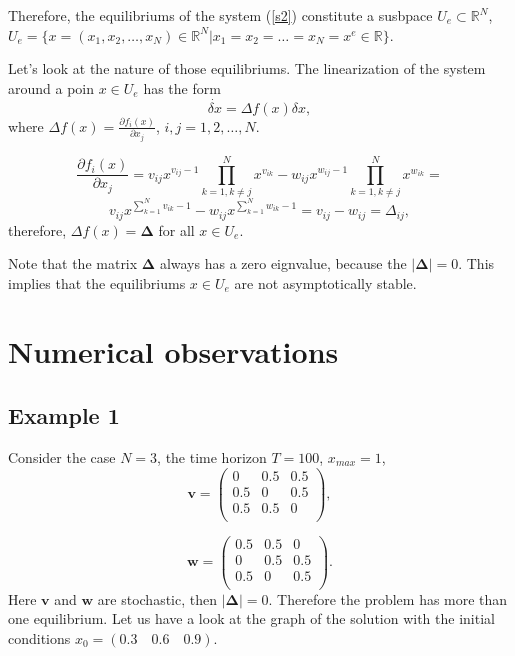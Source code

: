 \documentclass[a4paper,10pt, english]{article}
\newcommand{\D}{\displaystyle}
\begin{document}
Therefore, the equilibriums of the system (\ref{s2}) constitute a susbpace $U_e\subset\mathbb{R}^N$, $U_e = \{x = (x_1, x_2, \ldots, x_N)\in\mathbb{R}^N | x_1 =  x_2 = \ldots = x_N = x^e\in\mathbb{R}\}$.


\newpage
Let's look at the nature of those equilibriums. The linearization of the system around a poin $x\in U_e$ has the form
$$
\dot{\delta x} = \Delta f(x) \delta x,
$$
where $\D \Delta f(x) = \frac{\partial f_i(x)}{\partial x_j}$, $i, j =1, 2, \ldots, N.$

$$
\frac{\partial f_i(x)}{\partial x_j} = v_{ij}x^{v_{ij}-1}\prod_{k=1, k\neq j}^{N}x^{v_{ik}} - w_{ij}x^{w_{ij}-1}\prod_{k=1, k\neq j}^{N}x^{w_{ik}} =
$$
$$
v_{ij}x^{\sum_{k=1}^{N}v_{ik} - 1} - w_{ij}x^{\sum_{k=1}^{N}w_{ik} - 1} = v_{ij} - w_{ij} = \Delta_{ij},
$$
therefore,  $\Delta f(x) = \mathbf{\Delta}$ for all $x\in U_e$.

Note that the matrix $\mathbf{\Delta}$ always has a zero eignvalue, because the $|\mathbf{\Delta}| = 0$. This implies that the equilibriums $x\in U_e$ are not asymptotically stable.

\newpage
\section{Numerical observations}
\subsection{Example 1}


Consider the case $N=3$, the time horizon $T = 100$, $x_{max} = 1$,
$$
\mathbf{v} = 
\left(
\begin{matrix}
0 & 0.5 & 0.5 \\
0.5 & 0 & 0.5 \\
0.5 & 0.5 & 0 \\
\end{matrix}
\right),
$$

$$
\mathbf{w} = 
\left(
\begin{matrix}
0.5 & 0.5 & 0 \\
0 & 0.5 & 0.5 \\
0.5 & 0 & 0.5 \\
\end{matrix}
\right).
$$
Here $\mathbf{v}$ and $\mathbf{w}$ are stochastic, then $|\mathbf{\Delta}| = 0$. Therefore the problem has more than one equilibrium. 
Let us have a look at the graph of the solution with the initial conditions $x_0 = (0.3\quad 0.6\quad 0.9)$.
\end{document}
